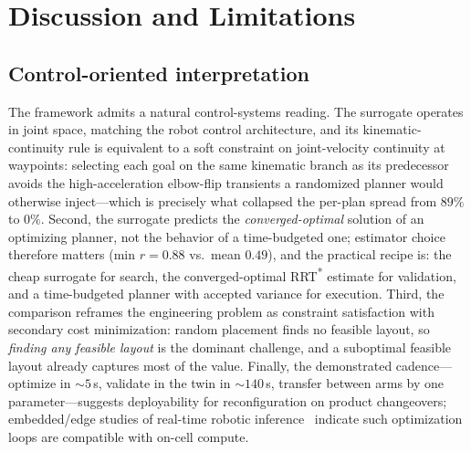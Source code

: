 \documentclass[conference]{IEEEtran}
\begin{document}
\section{Discussion and Limitations}
\label{sec:discussion}

\subsection{Control-oriented interpretation}
The framework admits a natural control-systems reading. The surrogate operates in
joint space, matching the robot control architecture, and its kinematic-continuity rule is
equivalent to a soft constraint on joint-velocity continuity at waypoints: selecting each goal
on the same kinematic branch as its predecessor avoids the high-acceleration elbow-flip
transients a randomized planner would otherwise inject---which is precisely what collapsed the
per-plan spread from $89\%$ to $0\%$. Second, the surrogate predicts the \emph{converged-optimal}
solution of an optimizing planner, not the behavior of a time-budgeted one; estimator choice
therefore matters (min $r=0.88$ vs.\ mean $0.49$), and the practical recipe is: the cheap
surrogate for search, the converged-optimal RRT\textsuperscript{*} estimate for validation, and
a time-budgeted planner with accepted variance for execution. Third, the comparison reframes the
engineering problem as constraint satisfaction with secondary cost minimization: random
placement finds no feasible layout, so \emph{finding any feasible layout} is the dominant
challenge, and a suboptimal feasible layout already captures most of the value. Finally, the
demonstrated cadence---optimize in $\sim\!5$\,s, validate in the twin in $\sim\!140$\,s,
transfer between arms by one parameter---suggests deployability for reconfiguration on product
changeovers; embedded/edge studies of real-time robotic inference~\cite{ahmed} indicate such
optimization loops are compatible with on-cell compute.
\end{document}
